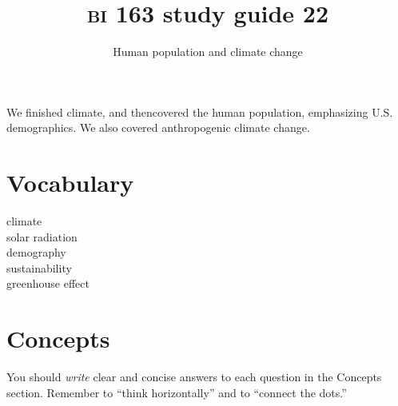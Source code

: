 \documentclass[letterpaper]{tufte-handout}
\title{{\scshape bi} 163 study guide 22}
\author{Human population and climate change }
\date{} %
\begin{document}
\maketitle	%

We finished climate, and thencovered the human population, emphasizing U.S. demographics. We also covered anthropogenic climate change.

\section*{Vocabulary}

\vspace{-1\baselineskip}
\begin{multicols}{2}
climate \\
solar radiation \\
demography \\
sustainability \\
greenhouse effect
\end{multicols}

\section*{Concepts}

You should \emph{write} clear and concise answers to each question in the Concepts section.  Remember to ``think horizontally'' and to ``connect the dots.'' 
\end{document}
